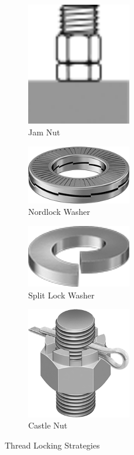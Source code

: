 \documentclass[10pt,letterpaper]{book}
\begin{document}
\begin{figure}[H]
		\begin{subfigure}[b]{.24\linewidth}
			\includegraphics[width=0.5\textwidth]{imgs/jamnut.png}
			\caption{Jam Nut}
		\end{subfigure}\begin{subfigure}[b]{.24\linewidth}
			\includegraphics[width=0.5\textwidth]{imgs/nordlock.png}
			\caption{Nordlock Washer}
		\end{subfigure}\begin{subfigure}[b]{.24\linewidth}
			\includegraphics[width=0.5\textwidth]{imgs/splitlock.png}
			\caption{Split Lock Washer}
		\end{subfigure}\begin{subfigure}[b]{.24\linewidth}
			\includegraphics[width=0.5\textwidth]{imgs/castlenut.png}
			\caption{Castle Nut}
		\end{subfigure}
		\caption{ Thread Locking Strategies}
	\end{figure}
	
\end{document}
